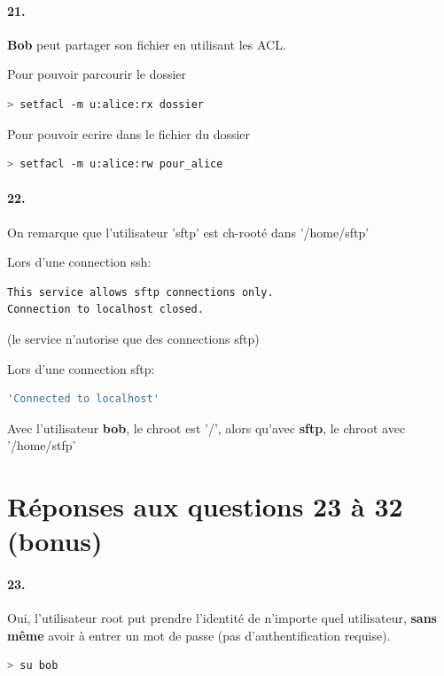 \documentclass[10pt]{article}
\begin{document}
        \paragraph{21.}
        \textbf{Bob} peut partager son fichier en utilisant les ACL.
        
        Pour pouvoir parcourir le dossier
\begin{lstlisting}[language=bash]
> setfacl -m u:alice:rx dossier
\end{lstlisting}

Pour pouvoir ecrire dans le fichier du dossier
\begin{lstlisting}[language=bash]
> setfacl -m u:alice:rw pour_alice
\end{lstlisting}
 
 \paragraph{22.}
 On remarque que l'utilisateur 'sftp' est ch-rooté dans '/home/sftp'

Lors d'une connection ssh:

\begin{lstlisting}[language=bash]
This service allows sftp connections only.
Connection to localhost closed.
\end{lstlisting}

(le service n'autorise que des connections sftp)

Lors d'une connection sftp:

\begin{lstlisting}[language=bash]
'Connected to localhost'
\end{lstlisting}

Avec l'utilisateur \textbf{bob}, le chroot est '/', alors qu'avec \textbf{sftp}, le chroot avec '/home/stfp'


    \section{Réponses aux questions 23 à 32 (bonus)}
    
     \paragraph{23.} Oui, l'utilisateur root put prendre l'identité de n'importe quel utilisateur, \textbf{sans même} avoir à entrer un mot de passe (pas d'authentification requise).

\begin{lstlisting}[language=bash]
> su bob
\end{lstlisting} 
    
\end{document}
